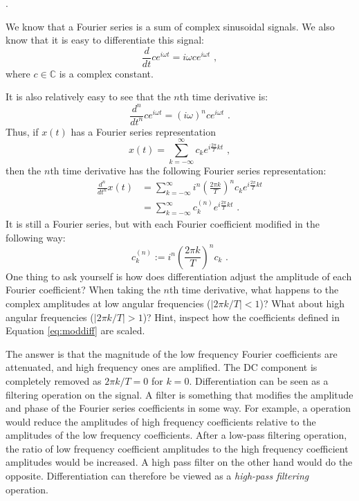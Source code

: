 .

We know that a Fourier series is a sum of complex sinusoidal signals. We also know that it is easy to differentiate this signal:
\begin{equation}
  \frac{d}{d t} c e^{i\omega t}=i\omega c e^{i\omega t}\,\,,
\end{equation}
where $c \in \mathbb{C}$ is a complex constant.

It is also relatively easy to see that the $n$th time derivative is:
\begin{equation}
  \frac{d^n}{dt^n}ce^{i\omega t} = (i\omega)^n c e^{i\omega t} \,\,.
\end{equation}
Thus, if $x(t)$ has a Fourier series representation
\begin{equation}
  x(t) = \sum_{k=-\infty}^{\infty} c_k e^{i\frac{2\pi}{T}kt}\,\,,
\end{equation}
then the $n$th time derivative has the following Fourier series representation:
\begin{align}
  \frac{d^n}{dt^n} x(t) & = \sum_{k=-\infty}^{\infty} i^n \left(\frac{2\pi k}{T}\right)^n c_k e^{i\frac{2\pi}{T}kt} \\
                        & = \sum_{k=-\infty}^{\infty} c^{(n)}_k e^{i\frac{2\pi}{T}kt} \,\,.
\end{align}
It is still a Fourier series, but with each Fourier coefficient modified in the following way:
\begin{equation}
  c_k^{(n)} := i^n \left(\frac{2\pi k}{T}\right)^n c_k \,\,.
  \label{eq:moddiff}
\end{equation}
One thing to ask yourself is how does differentiation adjust the
amplitude of each Fourier coefficient?  When taking the $n$th time
derivative, what happens to the complex amplitudes at low angular
frequencies ($|2\pi k/T| < 1$)? What about high angular frequencies
($|2\pi k/T| > 1$)?  Hint, inspect how the coefficients defined in
Equation \ref{eq:moddiff} are scaled.

The answer is that the magnitude of the low frequency Fourier
coefficients are attenuated, and high frequency ones are
amplified. The DC component is completely removed as $2\pi k/T = 0$
for $k=0$.  Differentiation can be seen as a filtering operation on
the signal. A filter is something that modifies the amplitude and
phase of the Fourier series coefficients in some way.  For example, a
\emph{} operation would reduce the amplitudes of high
frequency coefficients relative to the amplitudes of the low frequency
coefficients.  After a low-pass filtering operation, the ratio of low
frequency coefficient amplitudes to the high frequency coefficient
amplitudes would be increased. A high pass filter on the other hand
would do the opposite. Differentiation can therefore be viewed as
a \emph{high-pass filtering} operation.

